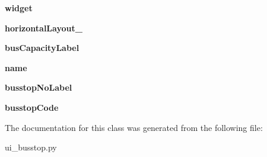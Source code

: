 \begin{DoxyCompactItemize}
\item 
\hypertarget{class_sim_g_d_c_1_1ui__busstop_1_1_ui___busstop_a153b2797096928415649958b5467edc5}{}{\bfseries widget}\label{class_sim_g_d_c_1_1ui__busstop_1_1_ui___busstop_a153b2797096928415649958b5467edc5}

\item 
\hypertarget{class_sim_g_d_c_1_1ui__busstop_1_1_ui___busstop_a5c7713e2b2801cdbe0d914c91f7806cd}{}{\bfseries horizontal\+Layout\+\_}\label{class_sim_g_d_c_1_1ui__busstop_1_1_ui___busstop_a5c7713e2b2801cdbe0d914c91f7806cd}

\item 
\hypertarget{class_sim_g_d_c_1_1ui__busstop_1_1_ui___busstop_a672d72a5fcda61937af7fb38f4dff17e}{}{\bfseries bus\+Capacity\+Label}\label{class_sim_g_d_c_1_1ui__busstop_1_1_ui___busstop_a672d72a5fcda61937af7fb38f4dff17e}

\item 
\hypertarget{class_sim_g_d_c_1_1ui__busstop_1_1_ui___busstop_a0b934bc79764d93bdfebf88b4b1b5711}{}{\bfseries name}\label{class_sim_g_d_c_1_1ui__busstop_1_1_ui___busstop_a0b934bc79764d93bdfebf88b4b1b5711}

\item 
\hypertarget{class_sim_g_d_c_1_1ui__busstop_1_1_ui___busstop_a303c370629828b8ce38752a6c8ef0e98}{}{\bfseries busstop\+No\+Label}\label{class_sim_g_d_c_1_1ui__busstop_1_1_ui___busstop_a303c370629828b8ce38752a6c8ef0e98}

\item 
\hypertarget{class_sim_g_d_c_1_1ui__busstop_1_1_ui___busstop_acdf311a1c8d37291b8312ddc6f9257dd}{}{\bfseries busstop\+Code}\label{class_sim_g_d_c_1_1ui__busstop_1_1_ui___busstop_acdf311a1c8d37291b8312ddc6f9257dd}

\end{DoxyCompactItemize}


The documentation for this class was generated from the following file\+:\begin{DoxyCompactItemize}
\item 
ui\+\_\+busstop.\+py\end{DoxyCompactItemize}
